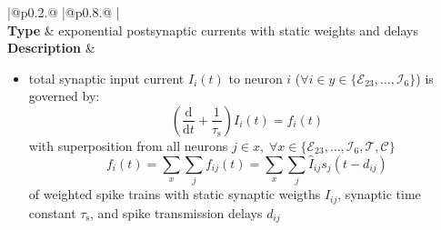 \documentclass[10pt,a4paper,twoside,american]{article}
\theoremstyle{definitionstyle}
\newcommand{\diff}{\ensuremath{\text{d}}}
\newcommand{\tauS}{\tau_\text{s}}
\begin{document}
\clearpage
\begin{table}
\begin{tabular}{
  |@{\hspace*{\marg}}p{}@{\hspace*{\marg}}
  |@{\hspace*{\marg}}p{}@{\hspace*{\marg}}
  |}
  \hline 
  \\
  \hline 
  \textbf{Type} & exponential postsynaptic currents with static weights and delays \\
  \hline 
  \textbf{Description} &
  \begin{itemize}
	\item total synaptic input current $I_i(t)$ to neuron $i$ ($\forall i \in y\in\{\mathcal{E}_{23},\ldots,\mathcal{I}_{6}\}$) is governed by:
		\begin{equation}
			\label{eq:synaptic_current}
			\left(\frac{\diff}{\diff t} + \frac{1}{\tauS}\right) I_{i} (t) = f_{i}(t)
		\end{equation}
		with superposition from all neurons $j \in x,\;\forall x\in\{\mathcal{E}_{23},\ldots,\mathcal{I}_{6}, \mathcal{T}, \mathcal{C}\}$
		\begin{equation*}
			f_{i} (t) = \sum_{x} \sum_{j} f_{ij} (t) = \sum_{x} \sum_{j} \hat{I}_{ij} s_{j}(t-d_{ij})
		\end{equation*}
		  of weighted spike trains with static synaptic weigths $\hat{I}_{ij}$, synaptic time constant $\tauS$, and spike transmission delays $d_{ij}$
		

\end{itemize}
\end{tabular}
\end{table}
\end{document}
